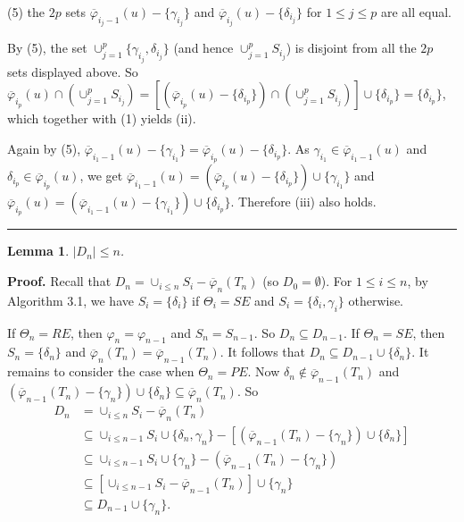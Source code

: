 \documentclass[11pt]{article}
\newtheorem{lemma}[theorem]{Lemma}
\newcommand{\phibar}{\overline{\varphi}}
\newcommand{\phiv}{\varphi}
\def\qed{\hfill \rule{4pt}{7pt}}
\begin{document}
(5) the $2p$ sets $\phibar_{i_j-1}(u)- \{\gamma_{i_j}\}$ and $\phibar_{i_j}(u)-\{\delta_{i_j}\}$ for $1\le j \le p$ are all equal. 

By (5), the set $\cup_{j=1}^p \{\gamma_{i_j}, \delta_{i_j}\}$ (and hence $\cup_{j=1}^p S_{i_j}$) is disjoint from all the $2p$ sets
displayed above. So $\phibar_{i_p}(u) \cap (\cup_{j=1}^p S_{i_j})= [(\phibar_{i_p}(u)- \{\delta_{i_p}\}) \cap  (\cup_{j=1}^p S_{i_j})]
\cup \{\delta_{i_p}\}=\{\delta_{i_p}\}$, which together with (1) yields (ii).

Again by (5), $\phibar_{i_1-1}(u)-\{\gamma_{i_1}\}=\phibar_{i_p}(u)-\{\delta_{i_p}\}$. As $\gamma_{i_1} 
\in \phibar_{i_1-1}(u)$ and $\delta_{i_p} \in \phibar_{i_p}(u)$, we get $\phibar_{i_1-1}(u)=(\phibar_{i_p}(u)-\{\delta_{i_p}\}) 
\cup \{\gamma_{i_1}\}$ and $\phibar_{i_p}(u)=(\phibar_{i_1-1}(u)- \{\gamma_{i_1}\}) \cup \{\delta_{i_p}\}$. Therefore (iii) also holds. \qed 

\begin{lemma}\label{Dnzang}
$|D_n|\leq n$.
\end{lemma}

{\bf Proof.}  Recall that $D_n=\cup_{i\leq n}S_i-\phibar_n(T_n)$ (so $D_0=\emptyset$). For $1 \le i \le n$, by Algorithm 3.1, we 
have $S_i=\{\delta_i\}$ if $\Theta_i=SE$ and $S_i=\{\delta_i, \gamma_i\}$ otherwise.

If $\Theta_n=RE$, then $\phiv_n = \phiv_{n-1}$ and $S_n = S_{n-1}$. 
So $D_n \subseteq D_{n-1}$. If $\Theta_n=SE$, then $S_n=\{\delta_n\}$ and $\phibar_n(T_n)=\phibar_{n-1}(T_n)$. 
It follows that $D_n \subseteq D_{n-1} \cup \{\delta_n\}$. It remains to consider the case when $\Theta_n=PE$. 
Now $\delta_n \notin \phibar_{n-1}(T_n)$ and $(\phibar_{n-1}(T_n)-\{\gamma_n\}) \cup  \{\delta_n \} \subseteq 
\phibar_{n}(T_n)$. So
\begin{equation*}
\begin{aligned}
D_n & =\cup_{i\leq n}S_i-\phibar_n(T_n)\\ 
& \subseteq \cup_{i\leq n-1} S_i \cup \{\delta_n,\gamma_n\} -[(\phibar_{n-1}(T_n)-\{\gamma_n\}) \cup \{ \delta_n \}]\\
& \subseteq \cup_{i\leq n-1} S_i \cup \{\gamma_n\} -(\phibar_{n-1}(T_n)-\{\gamma_n\})\\
& \subseteq [\cup_{i\leq n-1} S_i  - \phibar_{n-1}(T_n)] \cup \{\gamma_n\}\\
& \subseteq D_{n-1} \cup \{\gamma_n\}.
\end{aligned}
\end{equation*}
\end{document}
